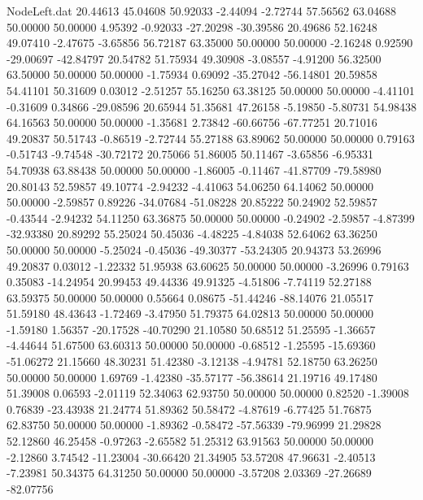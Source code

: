 \begin{filecontents}{NodeLeft.dat}
  20.44613   45.04608   50.92033    -2.44094   -2.72744   57.56562   63.04688   50.00000   50.00000    4.95392   -0.92033  -27.20298  -30.39586
  20.49686   52.16248   49.07410    -2.47675   -3.65856   56.72187   63.35000   50.00000   50.00000   -2.16248    0.92590  -29.00697  -42.84797
  20.54782   51.75934   49.30908    -3.08557   -4.91200   56.32500   63.50000   50.00000   50.00000   -1.75934    0.69092  -35.27042  -56.14801
  20.59858   54.41101   50.31609     0.03012   -2.51257   55.16250   63.38125   50.00000   50.00000   -4.41101   -0.31609    0.34866  -29.08596
  20.65944   51.35681   47.26158    -5.19850   -5.80731   54.98438   64.16563   50.00000   50.00000   -1.35681    2.73842  -60.66756  -67.77251
  20.71016   49.20837   50.51743    -0.86519   -2.72744   55.27188   63.89062   50.00000   50.00000    0.79163   -0.51743   -9.74548  -30.72172
  20.75066   51.86005   50.11467    -3.65856   -6.95331   54.70938   63.88438   50.00000   50.00000   -1.86005   -0.11467  -41.87709  -79.58980
  20.80143   52.59857   49.10774    -2.94232   -4.41063   54.06250   64.14062   50.00000   50.00000   -2.59857    0.89226  -34.07684  -51.08228
  20.85222   50.24902   52.59857    -0.43544   -2.94232   54.11250   63.36875   50.00000   50.00000   -0.24902   -2.59857   -4.87399  -32.93380
  20.89292   55.25024   50.45036    -4.48225   -4.84038   52.64062   63.36250   50.00000   50.00000   -5.25024   -0.45036  -49.30377  -53.24305
  20.94373   53.26996   49.20837     0.03012   -1.22332   51.95938   63.60625   50.00000   50.00000   -3.26996    0.79163    0.35083  -14.24954
  20.99453   49.44336   49.91325    -4.51806   -7.74119   52.27188   63.59375   50.00000   50.00000    0.55664    0.08675  -51.44246  -88.14076
  21.05517   51.59180   48.43643    -1.72469   -3.47950   51.79375   64.02813   50.00000   50.00000   -1.59180    1.56357  -20.17528  -40.70290
  21.10580   50.68512   51.25595    -1.36657   -4.44644   51.67500   63.60313   50.00000   50.00000   -0.68512   -1.25595  -15.69360  -51.06272
  21.15660   48.30231   51.42380    -3.12138   -4.94781   52.18750   63.26250   50.00000   50.00000    1.69769   -1.42380  -35.57177  -56.38614
  21.19716   49.17480   51.39008     0.06593   -2.01119   52.34063   62.93750   50.00000   50.00000    0.82520   -1.39008    0.76839  -23.43938
  21.24774   51.89362   50.58472    -4.87619   -6.77425   51.76875   62.83750   50.00000   50.00000   -1.89362   -0.58472  -57.56339  -79.96999
  21.29828   52.12860   46.25458    -0.97263   -2.65582   51.25312   63.91563   50.00000   50.00000   -2.12860    3.74542  -11.23004  -30.66420
  21.34905   53.57208   47.96631    -2.40513   -7.23981   50.34375   64.31250   50.00000   50.00000   -3.57208    2.03369  -27.26689  -82.07756

\end{filecontents}
